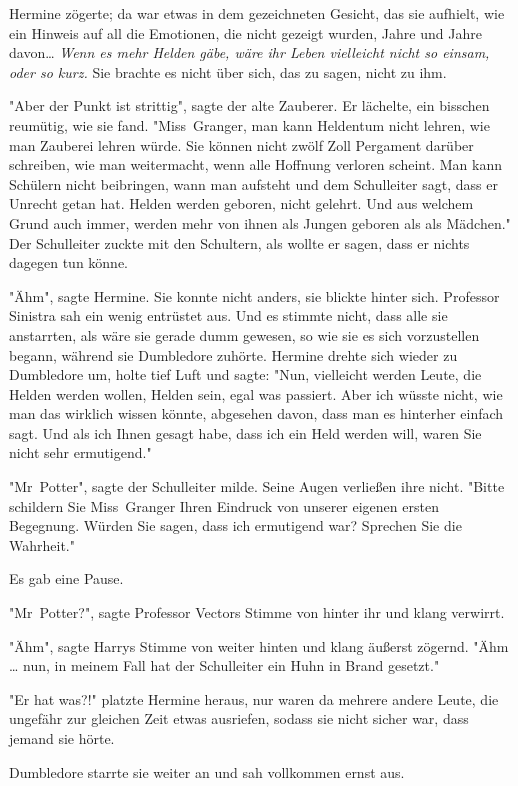 {Hermine zögerte; da war etwas in dem gezeichneten Gesicht, das sie aufhielt, wie ein Hinweis auf all die Emotionen, die nicht gezeigt wurden, Jahre und Jahre davon… \emph{Wenn es mehr Helden gäbe, wäre ihr Leben vielleicht nicht so einsam, oder so kurz.} Sie brachte es nicht über sich, das zu sagen, nicht zu ihm.

"Aber der Punkt ist strittig", sagte der alte Zauberer. Er lächelte, ein bisschen reumütig, wie sie fand. "Miss~Granger, man kann Heldentum nicht lehren, wie man Zauberei lehren würde. Sie können nicht zwölf Zoll Pergament darüber schreiben, wie man weitermacht, wenn alle Hoffnung verloren scheint. Man kann Schülern nicht beibringen, wann man aufsteht und dem Schulleiter sagt, dass er Unrecht getan hat. Helden werden geboren, nicht gelehrt. Und aus welchem Grund auch immer, werden mehr von ihnen als Jungen geboren als als Mädchen." Der Schulleiter zuckte mit den Schultern, als wollte er sagen, dass er nichts dagegen tun könne.

"Ähm", sagte Hermine. Sie konnte nicht anders, sie blickte hinter sich. Professor Sinistra sah ein wenig entrüstet aus. Und es stimmte nicht, dass alle sie anstarrten, als wäre sie gerade dumm gewesen, so wie sie es sich vorzustellen begann, während sie Dumbledore zuhörte. Hermine drehte sich wieder zu Dumbledore um, holte tief Luft und sagte: "Nun, vielleicht werden Leute, die Helden werden wollen, Helden sein, egal was passiert. Aber ich wüsste nicht, wie man das wirklich wissen könnte, abgesehen davon, dass man es hinterher einfach sagt. Und als ich Ihnen gesagt habe, dass ich ein Held werden will, waren Sie nicht sehr ermutigend."

"Mr~Potter", sagte der Schulleiter milde. Seine Augen verließen ihre nicht. "Bitte schildern Sie Miss~Granger Ihren Eindruck von unserer eigenen ersten Begegnung. Würden Sie sagen, dass ich ermutigend war? Sprechen Sie die Wahrheit."

Es gab eine Pause.

"Mr~Potter?", sagte Professor Vectors Stimme von hinter ihr und klang verwirrt.

"Ähm", sagte Harrys Stimme von weiter hinten und klang äußerst zögernd. "Ähm … nun, in meinem Fall hat der Schulleiter ein Huhn in Brand gesetzt."

"Er hat was?!" platzte Hermine heraus, nur waren da mehrere andere Leute, die ungefähr zur gleichen Zeit etwas ausriefen, sodass sie nicht sicher war, dass jemand sie hörte.

Dumbledore starrte sie weiter an und sah vollkommen ernst aus.

}
